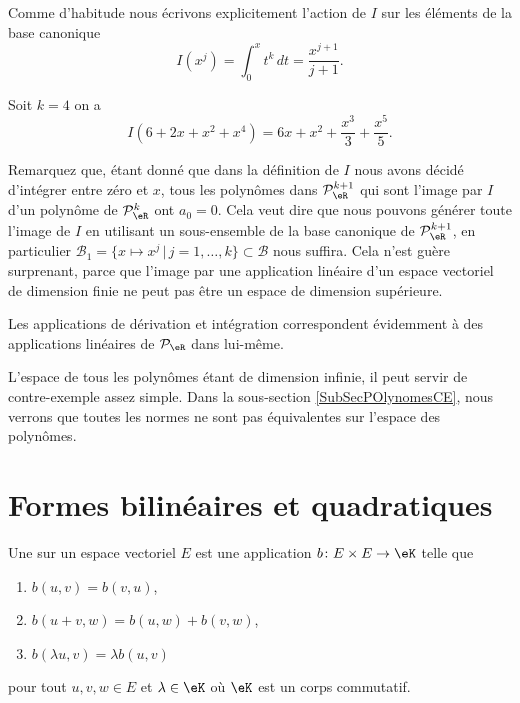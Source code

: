 \begin{description}
Comme d'habitude nous écrivons explicitement l'action de $I$ sur les éléments de la base canonique
\begin{equation}
    I(x^j)=\int_0^x t^k \,dt= \frac{x^{j+1}}{j+1}.
\end{equation}

\begin{example} 
   Soit $k=4$ on a 
  \begin{equation}
    I(6+2x+x^2+x^4)= 6x+x^2+\frac{x^3}{3}+\frac{x^5}{5}.
    \end{equation}
\end{example}

Remarquez que, étant donné que dans la définition de $I$ nous avons décidé d'intégrer entre zéro et $x$, tous les polynômes dans $\mathcal{P}_\eR^{k+1}$ qui sont l'image par $I$ d'un polynôme de $\mathcal{P}_\eR^{k}$ ont $a_0=0$. Cela veut dire que nous pouvons générer toute l'image de $I$ en utilisant un sous-ensemble de la base canonique de $\mathcal{P}_\eR^{k+1}$,  en particulier $\mathcal{B}_1=\{x\mapsto x^j \,|\, j=1, \ldots, k\}\subset \mathcal{B}$ nous suffira. Cela n'est guère surprenant, parce que l'image par une application linéaire d'un espace vectoriel de dimension finie ne peut pas être un espace de dimension supérieure. 
\end{description}

Les applications de dérivation et intégration correspondent évidemment à des applications linéaires de $\mathcal{P}_\eR$ dans lui-même. 

L'espace de tous les polynômes étant de dimension infinie, il peut servir de contre-exemple assez simple. Dans la sous-section \ref{SubSecPOlynomesCE}, nous verrons que toutes les normes ne sont pas équivalentes sur l'espace des polynômes.

\section{Formes bilinéaires et quadratiques}
\label{SecTQkRXIu}

\begin{definition}      \label{DEFooEEQGooNiPjHz}
    Une  sur un espace vectoriel \( E\) est une application \( b\colon E\times E\to \eK\) telle que
    \begin{enumerate}
        \item
            \( b(u,v)=b(v,u)\),
        \item
            \( b(u+v,w)=b(u,w)+b(v,w)\),
        \item
            \( b(\lambda u,v)=\lambda b(u,v)\)
    \end{enumerate}
    pour tout \( u,v,w\in E\) et \( \lambda\in \eK\) où \( \eK\) est un corps commutatif.
\end{definition}

